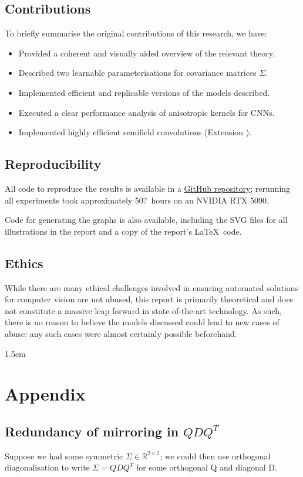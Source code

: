\documentclass[a4paper, 12pt]{report}
\def\comment#1{\color{red}#1\color{black}}
\begin{document}
\section{Contributions}
To briefly summarise the original contributions of this research, we have:
\begin{itemize}
\setlength{\itemsep}{0pt}
	\item Provided a coherent and visually aided overview of the relevant theory.
	\item Described two learnable parameterisations for covariance matrices $\Sigma$.
	\item Implemented efficient and replicable versions of the models described.
	\item Executed a clear performance analysis of anisotropic kernels for CNNs.
	\item Implemented highly efficient semifield convolutions (Extension \cite{extension}).
\end{itemize}

\section{Reproducibility}
All code to reproduce the results is available in a \href{https://github.com/p-adema/quadratic-conv}{\color{cyan}GitHub repository}; rerunning all experiments took approximately \comment{50?}\ hours on an NVIDIA RTX 5090.

Code for generating the graphs is also available, including the SVG files for all illustrations in the report and a copy of the report's \LaTeX \  code.
\section{Ethics}
While there are many ethical challenges involved in ensuring automated solutions for computer vision are not abused, this report is primarily theoretical and does not constitute a massive leap forward in state-of-the-art technology. As such, there is no reason to believe the models discussed could lead to new cases of abuse: any such cases were almost certainly possible beforehand.



{\footnotesize \emergencystretch 1.5em }


\newpage
\chapter{Appendix}
\section{Redundancy of mirroring in $QDQ^T$}
\label{sec:red-mirr}
Suppose we had some symmetric $\Sigma \in \mathbb{R}^{2\times 2}$; we could then use orthogonal diagonalisation to write $\Sigma = QDQ^T$ for some orthogonal Q and diagonal D.
\end{document}
